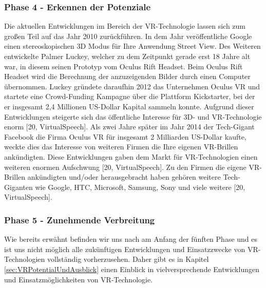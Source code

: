 \subsubsection{Phase 4 - Erkennen der Potenziale}
Die aktuellen Entwicklungen im Bereich der VR-Technologie lassen sich zum großen Teil auf das Jahr 2010 zurückführen.
\newline
In dem Jahr veröffentliche Google einen stereoskopischen 3D Modus für Ihre Anwendung Street View. Des Weiteren entwickelte Palmer Luckey, welcher zu dem Zeitpunkt gerade erst 18 Jahre alt war, in diesem seinen Prototyp vom Oculus Rift Headset. Beim Oculus Rift Headset wird die Berechnung der anzuzeigenden Bilder durch einen Computer übernommen. Luckey gründete daraufhin 2012 das Unternehmen Oculus VR und startete eine Crowd-Funding Kampagne über die Plattform Kickstarter, bei der er insgesamt 2,4 Millionen US-Dollar Kapital sammeln konnte. Aufgrund dieser Entwicklungen steigerte sich das öffentliche Interesse für 3D- und VR-Technologie enorm [20, VirtualSpeech].
\newline
Als zwei Jahre später im Jahr 2014 der Tech-Gigant Facebook die Firma Oculus VR für insgesamt 2 Milliarden US-Dollar kaufte, weckte dies das Interesse von weiteren Firmen die Ihre eigenen VR-Brillen ankündigten. Diese Entwicklungen gaben dem Markt für VR-Technologien einen weiteren enormen Aufschwung [20, VirtualSpeech].
\newline
Zu den Firmen die eigene VR-Brillen ankündigten und/oder herausgebracht haben gehören weitere Tech-Giganten wie Google, HTC, Microsoft, Samsung, Sony und viele weitere  [20, VirtualSpeech].

\subsubsection{Phase 5 - Zunehmende Verbreitung}
Wie bereits erwähnt befinden wir uns nach am Anfang der fünften Phase und es ist uns nicht möglich alle zukünftigen Entwicklungen und Einsatzzwecke von VR-Technologien vollständig vorherzusehen. Daher gibt es in Kapitel \ref{sec:VRPotentialUndAusblick} einen Einblick in vielversprechende Entwicklungen und Einsatzmöglichkeiten von VR-Technologie.



